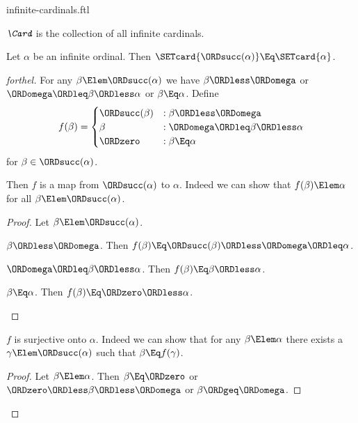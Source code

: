\documentclass{stex}
\begin{document}
\begin{smodule}{infinite-cardinals.ftl}

\begin{definition}[forthel,for=Card]
  $\emph{\Card}$ is the collection of all infinite cardinals.
\end{definition}

\begin{proposition}[forthel]
  Let $\alpha$ be an infinite ordinal.
  Then $\SETcard{\ORDsucc(\alpha)} \Eq \SETcard{\alpha}$.
\end{proposition}
\begin{proof}[forthel]
  For any $\beta \Elem \ORDsucc(\alpha)$ we have
  $\beta \ORDless \ORDomega$ or $\ORDomega \ORDleq \beta \ORDless \alpha$ or $\beta \Eq \alpha$.
  Define \[ f(\beta) =
    \begin{cases}
      \ORDsucc(\beta)  & : \beta \ORDless \ORDomega
      \\
      \beta         & : \ORDomega \ORDleq \beta \ORDless \alpha
      \\
      \ORDzero             & : \beta \Eq \alpha
    \end{cases} \]
  for $\beta \in \ORDsucc(\alpha)$.

  Then $f$ is a map from $\ORDsucc(\alpha)$ to $\alpha$.
  Indeed we can show that $f(\beta) \Elem \alpha$ for all
  $\beta \Elem \ORDsucc(\alpha)$.
  \begin{proof}
    Let $\beta \Elem \ORDsucc(\alpha)$.

    \begin{case}{$\beta \ORDless \ORDomega$.}
      Then $f(\beta)
        \Eq \ORDsucc(\beta)
        \ORDless \ORDomega
        \ORDleq \alpha$.
    \end{case}

    \begin{case}{$\ORDomega \ORDleq \beta \ORDless \alpha$.}
      Then $f(\beta)
        \Eq \beta
        \ORDless \alpha$.
    \end{case}

    \begin{case}{$\beta \Eq \alpha$.}
      Then $f(\beta)
        \Eq \ORDzero
        \ORDless \alpha$.
    \end{case}
  \end{proof}

  $f$ is surjective onto $\alpha$.
  Indeed we can show that for any $\beta \Elem \alpha$ there exists a
  $\gamma \Elem \ORDsucc(\alpha)$ such that $\beta \Eq f(\gamma)$.
  \begin{proof}
    Let $\beta \Elem \alpha$.
    Then $\beta \Eq \ORDzero$ or $\ORDzero \ORDless \beta \ORDless \ORDomega$ or $\beta \ORDgeq \ORDomega$.


\end{proof}
\end{proof}
\end{smodule}
\end{document}
